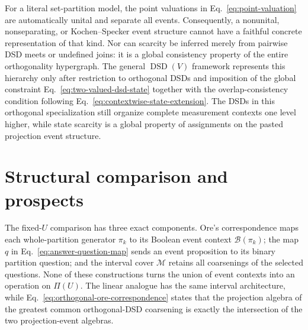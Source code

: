 \documentclass[aps,pra,reprint,nofootinbib]{revtex4-2}
\newcommand{\Part}{\Pi}
\newcommand{\BA}{\mathcal{B}}
\newcommand{\DSD}{\operatorname{DSD}}
\begin{document}
For a literal set-partition model, the point valuations in
Eq.~\eqref{eq:point-valuation} are automatically unital and separate all
events.  Consequently, a nonunital, nonseparating, or Kochen--Specker event
structure cannot have a faithful concrete representation of that kind.  Nor
can scarcity be inferred merely from pairwise DSD meets or undefined joins:
it is a global consistency property of the entire orthogonality hypergraph.
The general $\DSD(V)$ framework represents this hierarchy only after
restriction to orthogonal DSDs and imposition of the global constraint
Eq.~\eqref{eq:two-valued-dsd-state} together with the overlap-consistency
condition following Eq.~\eqref{eq:contextwise-state-extension}.  The DSDs
in this orthogonal specialization still organize complete measurement
contexts one level higher, while state scarcity is a global property of
assignments on the pasted projection event structure.

\section{Structural comparison and prospects}

The fixed-$U$ comparison has three exact components.  Ore's correspondence
maps each whole-partition generator $\pi_k$ to its Boolean event context
$\BA(\pi_k)$; the map $q$ in Eq.~\eqref{eq:answer-question-map} sends an
event proposition to its binary partition question; and the interval cover
$\mathcal M$ retains all coarsenings of the selected questions.  None of these
constructions turns the union of event contexts into an operation on
$\Part(U)$.  The linear analogue has the same interval architecture, while
Eq.~\eqref{eq:orthogonal-ore-correspondence} states that the projection algebra
of the greatest common orthogonal-DSD coarsening is exactly the intersection
of the two projection-event algebras.
\end{document}
